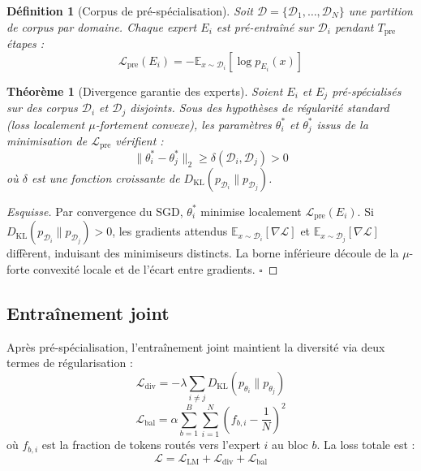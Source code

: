 \documentclass[10pt,a4paper]{article}
\newtheorem{theorem}{Théorème}
\newtheorem{definition}{Définition}
\begin{document}
\begin{definition}[Corpus de pré-spécialisation]
Soit $\mathcal{D} = \{\mathcal{D}_1, \ldots, \mathcal{D}_N\}$ une partition de corpus par domaine. Chaque expert $E_i$ est pré-entraîné sur $\mathcal{D}_i$ pendant $T_{\mathrm{pre}}$ étapes :
\begin{equation}
  \mathcal{L}_{\mathrm{pre}}(E_i) = -\mathbb{E}_{x \sim \mathcal{D}_i}\left[\log p_{E_i}(x)\right]
\end{equation}
\end{definition}

\begin{theorem}[Divergence garantie des experts]
Soient $E_i$ et $E_j$ pré-spécialisés sur des corpus $\mathcal{D}_i$ et $\mathcal{D}_j$ disjoints. Sous des hypothèses de régularité standard (loss localement $\mu$-fortement convexe), les paramètres $\theta_i^*$ et $\theta_j^*$ issus de la minimisation de $\mathcal{L}_{\mathrm{pre}}$ vérifient :
\begin{equation}
  \|\theta_i^* - \theta_j^*\|_2 \geq \delta(\mathcal{D}_i, \mathcal{D}_j) > 0
\end{equation}
où $\delta$ est une fonction croissante de $D_{\mathrm{KL}}(p_{\mathcal{D}_i} \| p_{\mathcal{D}_j})$.
\end{theorem}

\begin{proof}[Esquisse]
Par convergence du SGD, $\theta_i^*$ minimise localement $\mathcal{L}_{\mathrm{pre}}(E_i)$. Si $D_{\mathrm{KL}}(p_{\mathcal{D}_i} \| p_{\mathcal{D}_j}) > 0$, les gradients attendus $\mathbb{E}_{x \sim \mathcal{D}_i}[\nabla \mathcal{L}]$ et $\mathbb{E}_{x \sim \mathcal{D}_j}[\nabla \mathcal{L}]$ diffèrent, induisant des minimiseurs distincts. La borne inférieure découle de la $\mu$-forte convexité locale et de l'écart entre gradients. $\square$
\end{proof}

\subsection{Entraînement joint}

Après pré-spécialisation, l'entraînement joint maintient la diversité via deux termes de régularisation :
\begin{equation}
  \mathcal{L}_{\mathrm{div}} = -\lambda \sum_{i \neq j} D_{\mathrm{KL}}\!\left(p_{\theta_i} \| p_{\theta_j}\right)
\end{equation}
\begin{equation}
  \mathcal{L}_{\mathrm{bal}} = \alpha \sum_{b=1}^{B} \sum_{i=1}^{N} \left(f_{b,i} - \frac{1}{N}\right)^2
\end{equation}
où $f_{b,i}$ est la fraction de tokens routés vers l'expert $i$ au bloc $b$. La loss totale est :
\begin{equation}
  \mathcal{L} = \mathcal{L}_{\mathrm{LM}} + \mathcal{L}_{\mathrm{div}} + \mathcal{L}_{\mathrm{bal}}
\end{equation}
\end{document}

